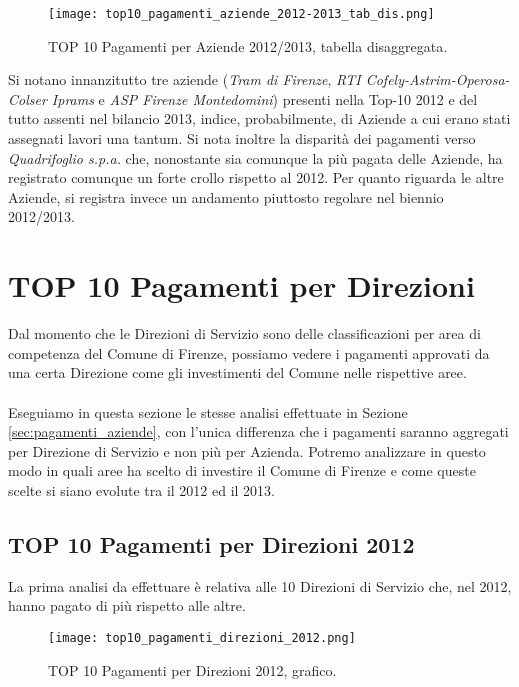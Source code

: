 			\begin{figure}[h!]
				\centering
					\texttt{[image: top10\_pagamenti\_aziende\_2012-2013\_tab\_dis.png]}
				\caption{TOP 10 Pagamenti per Aziende 2012/2013, tabella disaggregata.}
				\label{fig:top10_pagamenti_aziende_2012-2013_tab_dis}
			\end{figure}
			
			Si notano innanzitutto tre aziende (\textit{Tram di Firenze}, \textit{RTI Cofely-Astrim-Operosa-Colser Iprams} e \textit{ASP Firenze Montedomini}) presenti nella Top-10 2012 e del tutto assenti nel bilancio 2013, indice, probabilmente, di Aziende a cui erano stati assegnati lavori una tantum. Si nota inoltre la disparità dei pagamenti verso \textit{Quadrifoglio s.p.a.} che, nonostante sia comunque la più pagata delle Aziende, ha registrato comunque un forte crollo rispetto al 2012. Per quanto riguarda le altre Aziende, si registra invece un andamento piuttosto regolare nel biennio 2012/2013.
			
			\FloatBarrier
	
	\section{TOP 10 Pagamenti per Direzioni} \label{sec:top_pagamenti_direzioni}
	
		Dal momento che le Direzioni di Servizio sono delle classificazioni per area di competenza del Comune di Firenze, possiamo vedere i pagamenti approvati da una certa Direzione come gli investimenti del Comune nelle rispettive aree.\\
		\\
		Eseguiamo in questa sezione le stesse analisi effettuate in Sezione \ref{sec:pagamenti_aziende}, con l'unica differenza che i pagamenti saranno aggregati per Direzione di Servizio e non più per Azienda. Potremo analizzare in questo modo in quali aree ha scelto di investire il Comune di Firenze e come queste scelte si siano evolute tra il 2012 ed il 2013.
	
		\subsection{TOP 10 Pagamenti per Direzioni 2012} \label{subsec:top_pagamenti_direzioni_2012}
		
			La prima analisi da effettuare è relativa alle 10 Direzioni di Servizio che, nel 2012, hanno pagato di più rispetto alle altre.
		
			\begin{figure}[h!]
				\centering
					\texttt{[image: top10\_pagamenti\_direzioni\_2012.png]}
				\caption{TOP 10 Pagamenti per Direzioni 2012, grafico.}
				\label{fig:top10_pagamenti_direzioni_2012}
			\end{figure}
			
